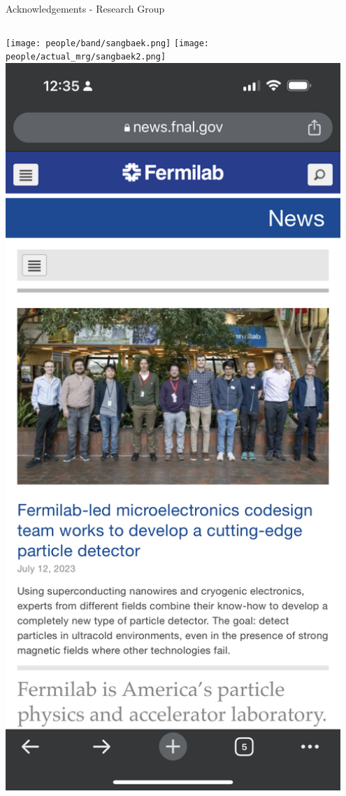 \documentclass[aspectratio=169]{beamer}
\begin{document}
\begin{frame}{Acknowledgements - Research Group}
    \begin{columns}
        \centering
            \texttt{[image: people/band/sangbaek.png]}
            \texttt{[image: people/actual\_mrg/sangbaek2.png]}
            \includegraphics[width=0.95\textwidth]{people/actual_mrg/sangbaek3.png}
    \end{columns}            
\end{frame}
\end{document}
